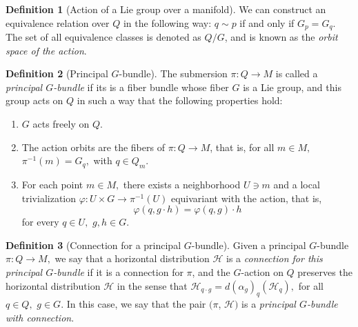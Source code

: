 \documentclass [xcolor=svgnames, t] {beamer}
\theoremstyle{definition}
\newtheorem{df}{Definition}
\theoremstyle{plain}
\theoremstyle{remark}
\begin{document}
\begin{frame}
\begin{df}[Action of a Lie group over a manifold]
We can construct an equivalence relation over $ Q $ in the following way: $ q\sim p $ if and only if $ G_p = G_q $. The set of all equivalence classes is denoted as $ Q/G $, and is known as the \textit{orbit space of the action}.     
\end{df}
\begin{df}[Principal $ G $-bundle]\label{df:principalGbundle}
	The submersion $ \pi: Q \rightarrow M$  is called a \textit{principal $ G $-bundle} if its is a fiber bundle whose fiber $ G $ is a Lie group, and this group acts on $ Q $ in such a way that the following properties hold:
	\begin{enumerate}
		\item $ G $ acts freely on $ Q $.
		\item The action orbits are the fibers of $ \pi:Q \rightarrow {M} $, that is, for all $ m\in M, $ $ \pi^{-1}(m) = G_q, $ with $ q\in Q_m. $ 
		\item For each point $ m\in M, $ there exists a neighborhood $ U\ni m $ and a local trivialization $ \varphi: U\times G \rightarrow \pi^{-1}(U)$ equivariant with the action, that is,
			$$ \varphi(q, g\cdot h)=\varphi(q,g)\cdot h  $$ 
			for every $ q\in U, $ $ g,h\in G. $ 
	\end{enumerate}
\end{df}
\begin{df}[Connection for a principal $ G $-bundle]
	Given a principal $ G $-bundle $ \pi: Q \rightarrow M, $ we say that a horizontal distribution $ \mathcal{H} $ is a \textit{connection for this principal $ G $-bundle} if it is a connection for $ \pi $, and the $ G $-action on $ Q $ preserves the horizontal distribution $ \mathcal{H} $ in the sense that $ \mathcal{H}_{q\cdot g} = d(\alpha_g)_q (\mathcal{H}_q), $ for all $ q\in Q, $ $ g\in G $. In this case, we say that the pair $ (\pi$, $ \mathcal{H}) $ is a \textit{principal $ G $-bundle with connection}. 


\end{df}
\end{frame}
\end{document}
